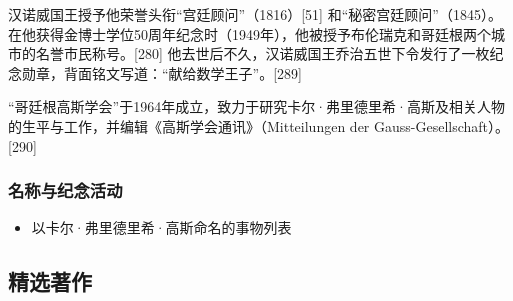 汉诺威国王授予他荣誉头衔“宫廷顾问”（1816）[51] 和“秘密宫廷顾问”（1845）。在他获得金博士学位50周年纪念时（1949年），他被授予布伦瑞克和哥廷根两个城市的名誉市民称号。[280] 他去世后不久，汉诺威国王乔治五世下令发行了一枚纪念勋章，背面铭文写道：“献给数学王子”。[289]

“哥廷根高斯学会”于1964年成立，致力于研究卡尔·弗里德里希·高斯及相关人物的生平与工作，并编辑《高斯学会通讯》（Mitteilungen der Gauss-Gesellschaft）。[290]
\subsubsection{名称与纪念活动}
\begin{itemize}
\item 以卡尔·弗里德里希·高斯命名的事物列表
\end{itemize}
\subsection{精选著作}  
